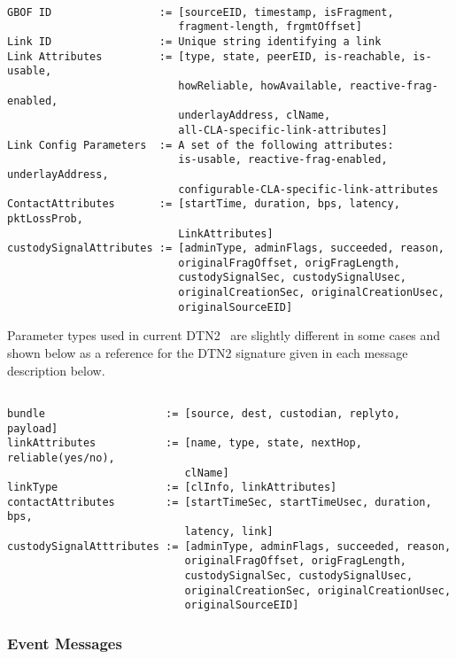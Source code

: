 \begin{verbatim}

GBOF ID                 := [sourceEID, timestamp, isFragment,
                           fragment-length, frgmtOffset]
Link ID                 := Unique string identifying a link
Link Attributes         := [type, state, peerEID, is-reachable, is-usable,
                           howReliable, howAvailable, reactive-frag-enabled,
                           underlayAddress, clName,
                           all-CLA-specific-link-attributes]
Link Config Parameters  := A set of the following attributes:
                           is-usable, reactive-frag-enabled, underlayAddress,
                           configurable-CLA-specific-link-attributes
ContactAttributes       := [startTime, duration, bps, latency, pktLossProb,
                           LinkAttributes]
custodySignalAttributes := [adminType, adminFlags, succeeded, reason,
                           originalFragOffset, origFragLength,
                           custodySignalSec, custodySignalUsec,
                           originalCreationSec, originalCreationUsec,
                           originalSourceEID]
\end{verbatim}

Parameter types used in current DTN2~\cite{MITRE-IF} are slightly
different in some cases and shown below as a reference for the DTN2
signature given in each message description below.

\begin{verbatim}

bundle                   := [source, dest, custodian, replyto, payload]
linkAttributes           := [name, type, state, nextHop, reliable(yes/no),
                            clName]
linkType                 := [clInfo, linkAttributes]
contactAttributes        := [startTimeSec, startTimeUsec, duration, bps, 
                            latency, link]
custodySignalAtttributes := [adminType, adminFlags, succeeded, reason,
                            originalFragOffset, origFragLength,
                            custodySignalSec, custodySignalUsec,
                            originalCreationSec, originalCreationUsec,
                            originalSourceEID]
\end{verbatim}


\subsubsection{Event Messages}
\label{sec:DP-EventMessages}

